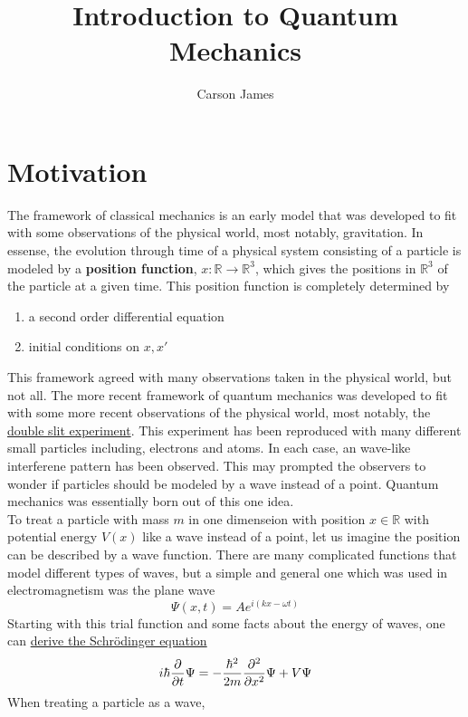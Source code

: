 \documentclass[12pt]{amsart}
\newcommand{\sch}{Schr\"{o}dinger }
\newcommand{\om}{\omega}
\newcommand{\R}{\mathbb{R}}
\begin{document}
\title{Introduction to Quantum Mechanics}
\author[James]{Carson James}
\maketitle


\tableofcontents

\section{Motivation}
The framework of classical mechanics is an early model that was developed to fit with some observations of the physical world, most notably, gravitation. In essense, the evolution through time of a physical system consisting of a particle is modeled by a \textbf{position function}, $x:\R \rightarrow \R^{3}$, which gives the positions in $\R^3$ of the particle at a given time. This position function is completely determined by
\begin{enumerate}
	\item a second order differential equation
	\item initial conditions on $x, x'$
\end{enumerate}
This framework agreed with many observations taken in the physical world, but not all. The more recent framework of quantum mechanics was developed to fit with some more recent observations of the physical world, most notably, the \href{https://en.wikipedia.org/wiki/Double-slit_experiment}{double slit experiment}. This experiment has been reproduced with many different small particles including, electrons and atoms. In each case, an wave-like interferene pattern has been observed. This may prompted the observers to wonder if particles should be modeled by a wave instead of a point. Quantum mechanics was essentially born out of this one idea. \vspace{.5cm} \\
To treat a particle with mass $m$ in one dimenseion with position $x \in \R$ with potential  energy $V(x)$ like a wave instead of a point, let us imagine the position can be described by a wave function. There are many complicated functions that model different types of waves, but a simple and general one which was used in electromagnetism was the plane wave $$\Psi(x,t) = Ae^{i(k x - \om t)}$$ Starting with this trial function and some facts about the energy of waves, one can \href{https://www.youtube.com/watch?v=IsX5iUKNT2k}{derive the \sch equation} $$i\hbar \pdv{t} \Psi =  -\frac{\hbar^2}{2m} \pdv[2]{x} \Psi + V \Psi$$
When treating a particle as a wave, 
\end{document}

